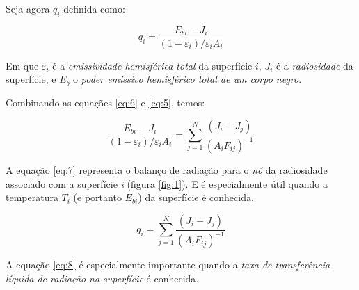 \documentclass[12pt,a4paper]{article}
\begin{document}
Seja agora $q_{i}$ definida como:

\begin{equation}
q_{i}=\frac{E_{bi}-J_{i}}{(1-\varepsilon _{i})/\varepsilon _{i}A_{i}}
\label{eq:6}
\end{equation}

Em que $\varepsilon _{i}$ é a \textit{emissividade hemisférica total} da superfície $i$, $J_{i}$ é a \textit{radiosidade} da superfície, e $E_{b}$ o \textit{poder emissivo hemisférico total de um corpo negro}.

Combinando as equações \ref{eq:6} e \ref{eq:5}, temos:

\begin{equation}
\frac{E_{bi}-J_{i}}{(1-\varepsilon _{i})/ \varepsilon _{i}A_{i}} = \sum _{j=1}^{N} \frac{(  J_{i} - J_{j}  )} {(A_{i}F_{ij})^{-1}}
\label{eq:7}
\end{equation}

A equação \ref{eq:7} representa o balanço de radiação para o \textit{nó} da radiosidade associado com a superfície \textit{i} (figura \ref{fig:1}). E é especialmente útil quando a temperatura $T_{i}$ (e portanto $E_{bi}$) da superfície é conhecida.

\begin{equation}
q_{i} = \sum _{j=1}^{N} \frac{(  J_{i} - J_{j}  )} {(A_{i}F_{ij})^{-1}}
\label{eq:8}
\end{equation}

A equação \ref{eq:8} é especialmente importante quando a \textit{taxa de transferência líquida de radiação na superfície} é conhecida.
\end{document}
